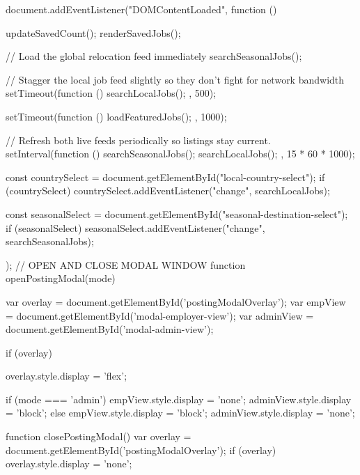         document.addEventListener("DOMContentLoaded", function () {
            updateSavedCount();
            renderSavedJobs();

            // Load the global relocation feed immediately
            searchSeasonalJobs();

            // Stagger the local job feed slightly so they don't fight for network bandwidth
            setTimeout(function () {
                searchLocalJobs();
            }, 500);

            setTimeout(function () {
                loadFeaturedJobs();
            }, 1000);

            // Refresh both live feeds periodically so listings stay current.
            setInterval(function () {
                searchSeasonalJobs();
                searchLocalJobs();
            }, 15 * 60 * 1000);

            const countrySelect = document.getElementById("local-country-select");
            if (countrySelect) {
                countrySelect.addEventListener("change", searchLocalJobs);
            }

            const seasonalSelect = document.getElementById("seasonal-destination-select");
            if (seasonalSelect) {
                seasonalSelect.addEventListener("change", searchSeasonalJobs);
            }
        });
        // OPEN AND CLOSE MODAL WINDOW
        function openPostingModal(mode) {
            var overlay = document.getElementById('postingModalOverlay');
            var empView = document.getElementById('modal-employer-view');
            var adminView = document.getElementById('modal-admin-view');

            if (overlay) {
                overlay.style.display = 'flex';

                if (mode === 'admin') {
                    empView.style.display = 'none';
                    adminView.style.display = 'block';
                } else {
                    empView.style.display = 'block';
                    adminView.style.display = 'none';
                }
            }
        }

        function closePostingModal() {
            var overlay = document.getElementById('postingModalOverlay');
            if (overlay) {
                overlay.style.display = 'none';
            }
        }

